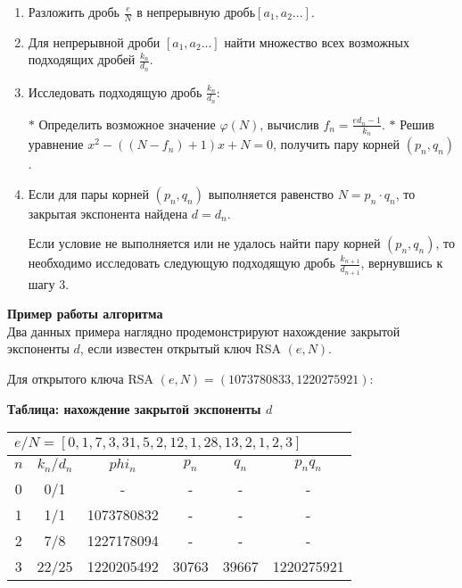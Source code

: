 \documentclass[12pt,a4paper]{scrartcl}
\begin{document}
\begin{enumerate}
	\item Разложить дробь ${\frac {e}{N}}$ в непрерывную дробь$[a_{1},a_{2}...]$.
	
	\item Для непрерывной дроби $[a_{1},a_{2}...]$ найти множество всех возможных подходящих дробей ${\frac {k_{n}}{d_{n}}}$.
	
	\item Исследовать подходящую дробь ${\frac {k_{n}}{d_{n}}}$:
	
	\subitem $*$ Определить возможное значение $\varphi (N)$, вычислив $f_{n}={\frac {ed_{n}-1}{k_{n}}}$.
	\subitem $*$ Решив уравнение $x^{2}-((N-f_{n})+1)x+N=0$, получить пару корней $(p_{n},q_{n})$.
	
	\item Если для пары корней $(p_{n},q_{n})$ выполняется равенство $N=p_{n}\cdot q_{n}$, то закрытая экспонента найдена $d=d_{n}$.
	
	Если условие не выполняется или не удалось найти пару корней $(p_{n},q_{n})$, то необходимо исследовать следующую подходящую дробь ${\frac {k_{n+1}}{d_{n+1}}}$, вернувшись к шагу 3.
\end{enumerate}

\textbf{Пример работы алгоритма}\\

Два данных примера наглядно продемонстрируют нахождение закрытой экспоненты $d$, если известен открытый ключ RSA $(e,N)$.

Для открытого ключа RSA $(e,N)=(1073780833,1220275921)$:

\textbf{Таблица: нахождение закрытой экспоненты $d$}
\begin{table}[H]
	\centering
	\begin{tabular}{|c|c|c|c|c|c|}
		\hline
		\multicolumn{6}{|l|}{$e/N = [0, 1, 7, 3, 31, 5, 2, 12, 1, 28, 13, 2, 1, 2, 3]$}                                                                                     \\ \hline
		\textit{\textbf{$n$}} & \textit{\textbf{$k_n / d_n$}} & \textit{\textbf{$phi_n$}} & \textit{\textbf{$p_n$}} & \textit{\textbf{$q_n$}} & \textit{\textbf{$p_n q_n$}} \\ \hline
		0                     & 0/1                           & -                         & -                       & -                       & -                           \\ \hline
		1                     & 1/1                           & 1073780832                & -                       & -                       & -                           \\ \hline
		2                     & 7/8                           & 1227178094                & -                       & -                       & -                           \\ \hline
		3                     & 22/25                         & 1220205492                & 30763                   & 39667                   & 1220275921                  \\ \hline
	\end{tabular}
\end{table}
\end{document}
